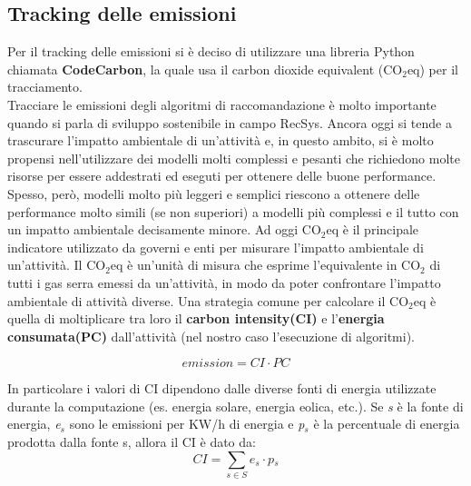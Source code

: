 \subsection{Tracking delle emissioni}
Per il tracking delle emissioni si è deciso di utilizzare una libreria Python chiamata \textbf{CodeCarbon}, la quale usa il carbon dioxide equivalent (CO$_2$eq) per il tracciamento.\\
\noindent
Tracciare le emissioni degli algoritmi di raccomandazione è molto importante quando si parla di sviluppo sostenibile in campo RecSys. Ancora oggi si tende a trascurare l'impatto ambientale di un'attività e, in questo ambito, si è molto propensi nell'utilizzare dei modelli molti complessi e pesanti
che richiedono molte risorse per essere addestrati ed eseguti per ottenere delle buone performance. Spesso, però, modelli molto più leggeri e semplici riescono a ottenere delle performance molto simili (se non superiori) a modelli più complessi e il tutto con un impatto ambientale decisamente minore.
Ad oggi CO$_2$eq è il principale indicatore utilizzato da governi e enti per misurare l'impatto ambientale di un'attività.
Il CO$_2$eq è un'unità di misura che esprime l'equivalente in CO$_2$ di tutti i gas serra emessi da un'attività, in modo da poter confrontare l'impatto ambientale di attività diverse.
Una strategia comune per calcolare il CO$_2$eq è quella di moltiplicare tra loro il \textbf{carbon intensity(CI)} e l'\textbf{energia consumata(PC)} dall'attività (nel nostro caso l'esecuzione di algoritmi).



\begin{equation}
    \textit{emission} = \textit{CI}  \cdot \textit{PC}
\end{equation}

\noindent In particolare i valori di CI dipendono dalle diverse fonti di energia utilizzate durante la computazione 
(es. energia solare, energia eolica, etc.). Se \textit{s} è la fonte di energia,  \textit{e$_s$} sono le emissioni per KW/h di energia e \textit{p$_s$}  è la percentuale di energia prodotta dalla fonte s, allora il CI è dato da:
\begin{equation}
    \textit{CI} = \sum_{s \in S} \textit{e$_s$} \cdot \textit{p$_s$}
\end{equation}
